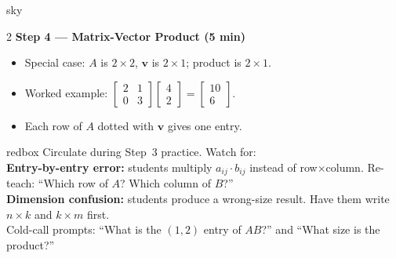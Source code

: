 \documentclass[10pt]{article}
\begin{document}
\begin{skillbox}[Lesson]{sky}
\begin{multicols}{2}
    \textbf{Step 4 --- Matrix-Vector Product (5 min)}
    \begin{itemize}\setlength{\itemsep}{2pt}
        \item Special case: $A$ is $2\times 2$, $\mathbf{v}$ is $2\times 1$; product is $2\times 1$.
        \item Worked example: $\begin{bmatrix}2&1\\0&3\end{bmatrix}\begin{bmatrix}4\\2\end{bmatrix} = \begin{bmatrix}10\\6\end{bmatrix}$.
        \item Each row of $A$ dotted with $\mathbf{v}$ gives one entry.
    \end{itemize}

    \end{multicols}
\end{skillbox}

\begin{skillbox}{redbox}
    Circulate during Step~3 practice. Watch for:\\[2pt]
    \textbf{Entry-by-entry error:} students multiply $a_{ij}\cdot b_{ij}$ instead of row$\times$column. Re-teach: ``Which row of $A$? Which column of $B$?''\\[2pt]
    \textbf{Dimension confusion:} students produce a wrong-size result. Have them write $n\times k$ and $k\times m$ first.\\[2pt]
    Cold-call prompts: ``What is the $(1,2)$ entry of $AB$?'' and ``What size is the product?''
\end{skillbox}
\end{document}
